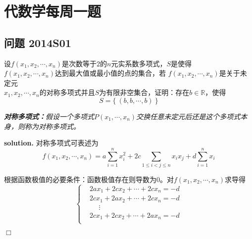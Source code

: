 \chapter{代数学每周一题}

\section{问题 2014S01}

\begin{mdframed}
    \begin{question}
        设$f(x_1,x_2,\cdots,x_n)$是次数等于$2$的$n$元实系数多项式，$S$是使得\\$f(x_1,x_2,\cdots,x_n)$达到最大值或最小值的点的集合，若
        $f(x_1,x_2,\cdots,x_n)$是关于未定元\\$x_1,x_2,\cdots,x_n$的对称多项式并且$S$为有限非空集合，证明：存在$b\in \mathbb{R}$，使得
        \begin{equation}
            S=\{\ (b,b,\cdots,b) \ \}
        \end{equation}
    \end{question}
\end{mdframed}

\begin{mdframed}[linewidth=0pt,backgroundcolor=gray!20]
    \textsl{\textbf{对称多项式：}假设一个多项式$P(x_1,\cdots,x_n)$交换任意未定元后还是这个多项式本身，则称为对称多项式。}
\end{mdframed}

\textbf{solution.} 对称多项式可表述为
\begin{equation}
    f(x_1,x_2,\cdots,x_n)=a\sum_{i=1}^{n}x^2_i+2c\sum_{1\leq i<j\leq n} x_ix_j+d\sum_{i=1}^{n}x_i
\end{equation}

根据函数极值的必要条件：函数极值存在则导数为0。对$f(x_1,x_2,\cdots,x_n)$求导得
\begin{equation}
    \begin{cases}
        & 2ax_1+2cx_2+\cdots+2cx_n=-d \\
        & 2cx_1+2ax_2+\cdots+2cx_n=-d \\
        &\ \ \ \ \ \  \vdots \ \ \\
        & 2cx_1+2cx_2+\cdots+2ax_n=-d \\
    \end{cases}
\end{equation}


$\Box$
